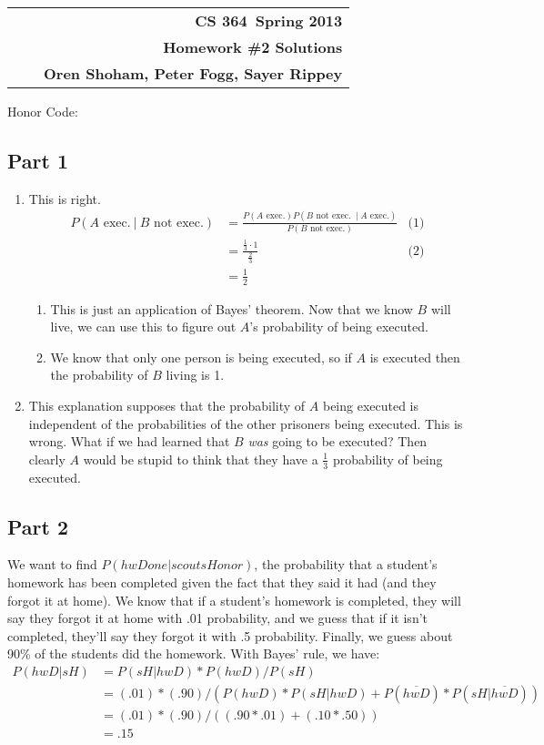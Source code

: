\documentclass[11pt]{article}
\makeatletter
\newcommand{\course}{CS 364}
\newcommand{\semester}{Spring 2013}
\newcommand{\hwk}{Homework \#2 Solutions}
\newcommand{\student}{Oren Shoham, Peter Fogg, Sayer Rippey}
\renewcommand\maketitle{
  \begin{center}
    \begin{tabular*}{6.44in}{l @{\extracolsep{\fill}}c r}
      \bfseries  &  & \bfseries \course ~\semester \\
      \bfseries&  & \bfseries  \hwk  \\
      \bfseries   &   &  \bfseries \student \\ 
    \end{tabular*}
\end{center} }
\makeatother
\begin{document}
\maketitle
\thispagestyle{plain}


\noindent Honor Code: 

\subsection*{Part 1}
\begin{enumerate}
\item This is right.
  \begin{align*}
    P(A \text{ exec.}\ |\ B \text{ not exec.}) &= \frac{P(\text{$A$ exec.})P(\text{$B$ not exec. $\ |\ A$ exec.})}{P(\text{$B$ not exec.})} & \text{(1)} \\
    &= \frac{\frac{1}{3} \cdot 1}{\frac{2}{3}} & \text{(2)} \\
    &= \frac{1}{2}
  \end{align*}
  \begin{enumerate}[(1)]
    \item This is just an application of Bayes' theorem. Now that we know $B$ will live, we can use this to figure out $A$'s probability of being executed.
    \item We know that only one person is being executed, so if $A$ is executed then the probability of $B$ living is 1.
  \end{enumerate}
\item This explanation supposes that the probability of $A$ being executed is independent of the probabilities of the other prisoners being executed. This is wrong. What if we had learned that $B$ \emph{was} going to be executed? Then clearly $A$ would be stupid to think that they have a $\frac{1}{3}$ probability of being executed.
\end{enumerate}
\subsection*{Part 2}
We want to find $P(hwDone|scoutsHonor)$, the probability that a student's homework has been completed given the fact that they said it had (and they forgot it at home). We know that if a student's homework is completed, they will say they forgot it at home with .01 probability, and we guess that if it isn't completed, they'll say they forgot it with .5 probability. Finally, we guess about 90\% of the students did the homework. With Bayes' rule, we have:
 \begin{align*}
P(hwD|sH) &= P(sH|hwD) *P(hwD) / P(sH) \\
&= (.01) * (.90) / (P(hwD)*P(sH|hwD) + P(\overline{hwD})*P(sH| \overline{hwD})) \\
&= (.01) * (.90) / ((.90*.01)+(.10*.50))\\
&= .15\\
\end{align*}
\end{document}
